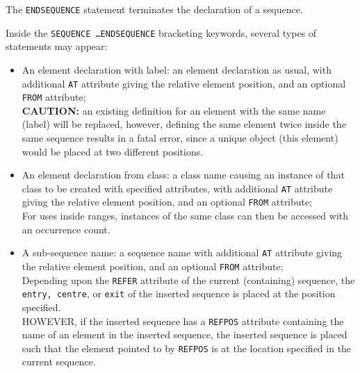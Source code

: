 The \texttt{ENDSEQUENCE} statement terminates the declaration of a
sequence. 

Inside the \texttt{SEQUENCE \ldots ENDSEQUENCE} bracketing keywords,
several types of statements may appear:
\begin{itemize}

\item An element declaration with label: 
  an element declaration as usual, with additional \texttt{AT}
  attribute giving the relative element position, and an optional
  \texttt{FROM} attribute; \\ 
  \textbf{CAUTION:} an existing definition for an element with the
  same name (label) will be replaced, however, defining the same
  element twice inside the same sequence results in a fatal error,
  since a unique object (this element) would be placed at two
  different positions.

\item An element declaration from class: 
  a class name causing an instance of that class to be created with
  specified attributes, with additional \texttt{AT} attribute giving the
  relative element position, and an optional \texttt{FROM} attribute;\\
  For uses inside ranges, instances of the same class can then be
  accessed with an occurrence count.

\item A sub-sequence name:
  a sequence name with additional \texttt{AT} attribute giving the
  relative element position, and an optional \texttt{FROM} attribute;\\ 
  Depending upon the \texttt{REFER} attribute of the current (containing)
  sequence, the \texttt{entry, centre}, or \texttt{exit} of
  the inserted sequence is placed at the position specified. \\
  HOWEVER, if the inserted sequence has a \texttt{REFPOS} attribute containing
  the name of an element in the inserted sequence, the inserted sequence
  is placed such that the element pointed to by \texttt{REFPOS} is at
  the location specified in the current sequence.
\end{itemize} 


